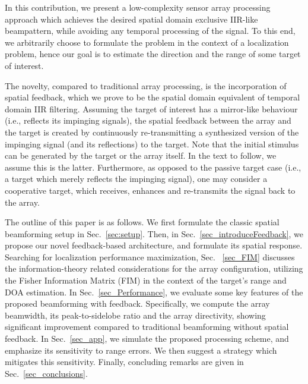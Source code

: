 \par In this contribution, we present a low-complexity sensor array processing approach which achieves the desired spatial domain exclusive IIR-like beampattern, while avoiding any temporal processing of the signal.
To this end, we arbitrarily choose to formulate the problem in the context of a localization problem, hence our goal is to estimate the direction and the range of some target of interest. 
\par The novelty, compared to traditional array processing, is the incorporation of spatial feedback, which we prove to be the spatial domain equivalent of temporal domain IIR filtering.
Assuming the target of interest has a mirror-like behaviour (i.e., reflects its impinging signals), the spatial feedback between the array and the target is created by continuously re-transmitting a synthesized version of the impinging signal (and its reflections) to the target.
Note that the initial stimulus can be generated by the target or the array itself. In the text to follow, we assume this is the latter. 
Furthermore, as opposed to the passive target case (i.e., a target which merely reflects the impinging signal), one may consider a cooperative target, which receives, enhances and re-transmits the signal back to the array. 
\par The outline of this paper is as follows. We first formulate the classic spatial beamforming setup in Sec.~\ref{sec:setup}. Then, in Sec.~\ref{sec_introduceFeedback}, we propose our novel feedback-based architecture, and formulate its spatial response.
Searching for localization performance maximization, Sec.~ \ref{sec_FIM} discusses the information-theory related considerations for the array configuration, utilizing the Fisher Information Matrix (FIM) in the context of the target's range and DOA estimation.
In Sec.~\ref{sec_Performance}, we evaluate some key features of the proposed beamforming with feedback. Specifically, we compute the array beamwidth, its peak-to-sidelobe ratio and the array directivity, showing significant improvement compared to traditional beamforming without spatial feedback. 
In Sec.~\ref{sec_app}, we simulate the proposed processing scheme, and emphasize its sensitivity to range errors. We then suggest a strategy which mitigates this sensitivity. Finally, concluding remarks are given in Sec.~\ref{sec_conclusions}.
